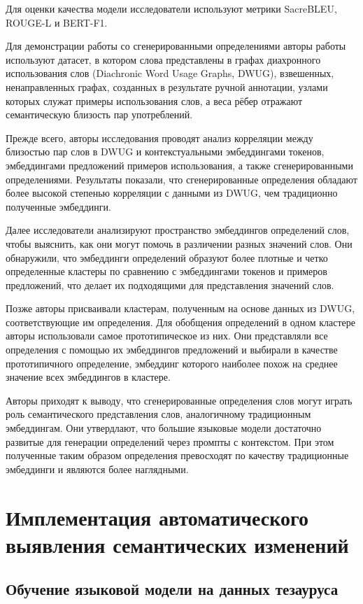 \documentclass[LI,VKR]{HSEUniversity}
\begin{document}
Для оценки качества модели исследователи используют метрики SacreBLEU, ROUGE-L и BERT-F1.

Для демонстрации работы со сгенерированными определениями авторы
работы используют датасет, в котором слова представлены в графах диахронного использования
слов (Diachronic Word Usage Graphs, DWUG), взвешенных, ненаправленных графах, созданных
в результате ручной аннотации, узлами которых служат примеры использования слов,
а веса рёбер отражают семантическую близость пар употреблений.

Прежде всего, авторы исследования проводят анализ корреляции между близостью пар слов в DWUG
и контекстуальными эмбеддингами токенов, эмбеддингами предложений примеров использования, а также
сгенерированными определениями.
Результаты показали, что сгенерированные определения обладают более высокой степенью
корреляции с данными из DWUG, чем традиционно полученные эмбеддинги.

Далее исследователи анализируют пространство эмбеддингов определений слов,
чтобы выяснить, как они могут помочь в различении разных значений слов.
Они обнаружили, что эмбеддинги определений образуют более плотные и четко определенные
кластеры по сравнению с эмбеддингами токенов и примеров предложений, что делает их
подходящими для представления значений слов.

Позже авторы присваивали кластерам, полученным на основе данных из DWUG,
соответствующие им определения.
Для обобщения определений в одном кластере авторы использовали самое прототипическое из них.
Они представляли все определения с помощью их эмбеддингов предложений и выбирали в качестве
прототипичного определение, эмбеддинг которого наиболее похож на среднее значение всех
эмбеддингов в кластере.

Авторы приходят к выводу, что сгенерированные определения слов могут играть роль
семантического представления слов, аналогичному традиционным эмбеддингам.
Они утвердлают, что большие языковые модели достаточно развитые для генерации определений
через промпты с контекстом.
При этом полученные таким образом определения превосходят по качеству
традиционные эмбеддинги и являются более наглядными.

\chapter{Имплементация автоматического выявления семантических изменений}

\section{Обучение языковой модели на данных тезауруса}
\end{document}
